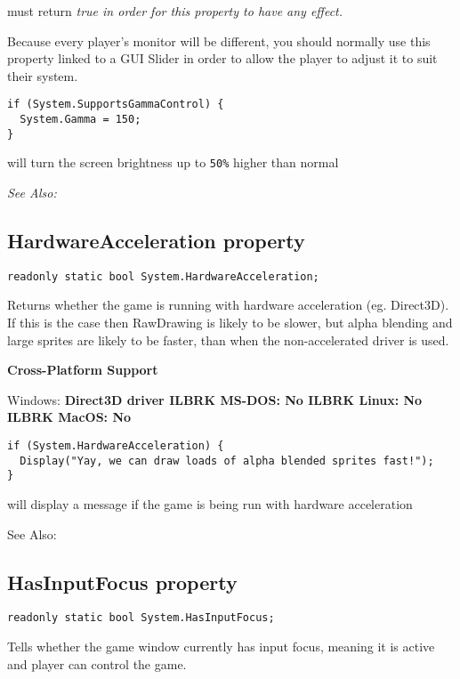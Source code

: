  must return \it{true}
in order for this property to have any effect.

Because every player's monitor will be different, you should normally use this property linked to a GUI Slider
in order to allow the player to adjust it to suit their system.

\begin{verbatim}
if (System.SupportsGammaControl) {
  System.Gamma = 150;
}
\end{verbatim}
will turn the screen brightness up to \verb$50%$ higher than normal

\it{See Also:} 


\subsection{HardwareAcceleration property}\label{System.HardwareAcceleration}%

\begin{verbatim}
readonly static bool System.HardwareAcceleration;
\end{verbatim}
Returns whether the game is running with hardware acceleration (eg. Direct3D). If this is
the case then RawDrawing is likely to be slower, but alpha blending and large sprites are
likely to be faster, than when the non-accelerated driver is used.

\bf{Cross-Platform Support}

Windows: \bf{ Direct3D driver }ILBRK
MS-DOS: \bf{ No }ILBRK
Linux: \bf{ No }ILBRK
MacOS: \bf{ No }

\begin{verbatim}
if (System.HardwareAcceleration) {
  Display("Yay, we can draw loads of alpha blended sprites fast!");
}
\end{verbatim}
will display a message if the game is being run with hardware acceleration

See Also: 


\subsection{HasInputFocus property}\label{System.HasInputFocus}%

\begin{verbatim}
readonly static bool System.HasInputFocus;
\end{verbatim}
Tells whether the game window currently has input focus, meaning it is active and player can control the game.

